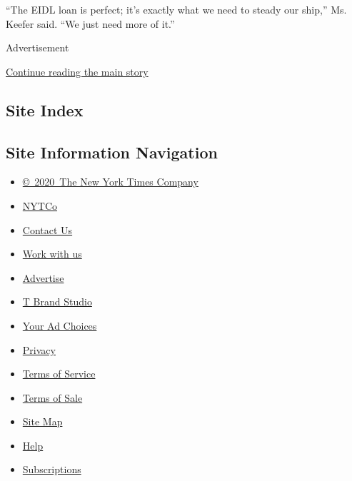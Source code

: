 ``The EIDL loan is perfect; it's exactly what we need to steady our
ship,'' Ms. Keefer said. ``We just need more of it.''

Advertisement

\protect\hyperlink{after-bottom}{Continue reading the main story}

\hypertarget{site-index}{%
\subsection{Site Index}\label{site-index}}

\hypertarget{site-information-navigation}{%
\subsection{Site Information
Navigation}\label{site-information-navigation}}

\begin{itemize}
\tightlist
\item
  \href{https://help.nytimes.com/hc/en-us/articles/115014792127-Copyright-notice}{©~2020~The
  New York Times Company}
\end{itemize}

\begin{itemize}
\tightlist
\item
  \href{https://www.nytco.com/}{NYTCo}
\item
  \href{https://help.nytimes.com/hc/en-us/articles/115015385887-Contact-Us}{Contact
  Us}
\item
  \href{https://www.nytco.com/careers/}{Work with us}
\item
  \href{https://nytmediakit.com/}{Advertise}
\item
  \href{http://www.tbrandstudio.com/}{T Brand Studio}
\item
  \href{https://www.nytimes.com/privacy/cookie-policy\#how-do-i-manage-trackers}{Your
  Ad Choices}
\item
  \href{https://www.nytimes.com/privacy}{Privacy}
\item
  \href{https://help.nytimes.com/hc/en-us/articles/115014893428-Terms-of-service}{Terms
  of Service}
\item
  \href{https://help.nytimes.com/hc/en-us/articles/115014893968-Terms-of-sale}{Terms
  of Sale}
\item
  \href{https://spiderbites.nytimes.com}{Site Map}
\item
  \href{https://help.nytimes.com/hc/en-us}{Help}
\item
  \href{https://www.nytimes.com/subscription?campaignId=37WXW}{Subscriptions}
\end{itemize}
